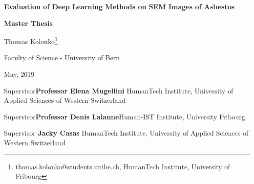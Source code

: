 \documentclass[11pt,a4paper,twoside,hidelinks,openright]{rvsmaster}
\makeatletter
\newcommand{\thesistitle}{Evaluation of Deep Learning Methods on SEM Images of Asbestos}
\newcommand{\thesisauthor}{Thomas Kolonko\footnote{thomas.kolonko@students.unibe.ch, HumanTech Institute, University of Fribourg}}
\newcommand{\thesisleiter}{Supervisor\linebreak \textbf{Professor Elena Mugellini}\linebreak
HumanTech Institute, University of Applied Sciences of Western Switzerland}
\newcommand{\thesisexpert}{Supervisor\linebreak \textbf{Professor Denis Lalanne}\linebreak Human-IST Institute, University Fribourg}
\newcommand{\thesisasst}{Supervisor \linebreak \textbf{Jacky Casas} \linebreak HumanTech Institute, University of Applied Sciences of Western Switzerland}
\newcommand{\thesisdate}{May, 2019}
\makeatother
\begin{document}
\begin{titlepage}  
  \begin{center}  
  
  \begin{figure}[t]  
  \vspace*{-2cm}        %
  \vspace{0.4in}     
  \end{figure}

    \thispagestyle{empty}
    
    {\bfseries\Huge \thesistitle \par}

    \vspace{0.3in} 
    \LARGE{\textbf{Master Thesis} \\}
    \vspace{0.4in}

    {\Large \thesisauthor}
    
    \vspace{0.3in}
    {\Large Faculty of Science - University of Bern \par}
    \vfill
    {\Large \thesisdate \par}
    \vspace{0.3in}
    {\normalsize \thesisleiter \par}
	\vspace{0.15in}    
    {\normalsize \thesisexpert \par}
    \vspace{0.15in}    
    {\normalsize \thesisasst \par}
  

  \vspace{0.9in}
 

\end{center}
\end{titlepage}
\end{document}

